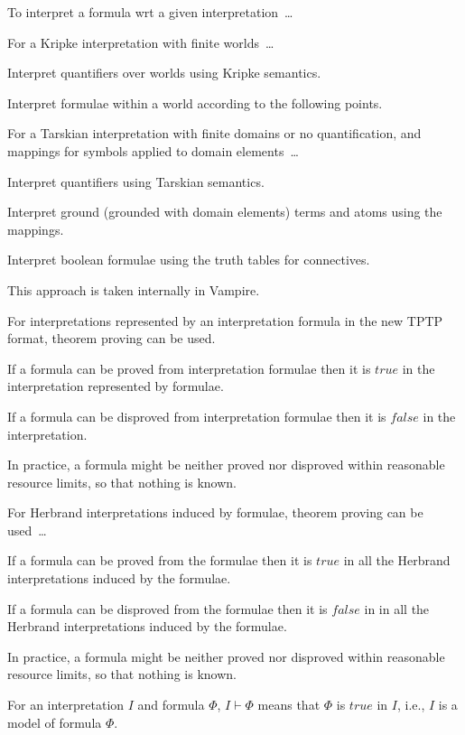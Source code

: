\documentclass{easychair}
\newenvironment{packed_itemize}{
\vspace*{-0.2em}
\begin{itemize}
\setlength{\partopsep}{0pt}
\setlength{\itemsep}{1pt}
\setlength{\parskip}{0pt}
\setlength{\parsep}{0pt}
}{\end{itemize}}
\begin{document}
To interpret a formula wrt a given interpretation~\ldots
\begin{packed_itemize}
\item For a Kripke interpretation with finite worlds~\ldots
      \begin{packed_itemize}
      \item Interpret quantifiers over worlds using Kripke semantics.
      \item Interpret formulae within a world according to the following points.
      \end{packed_itemize}
\item For a Tarskian interpretation with finite domains or no quantification, and mappings for 
      symbols applied to domain elements~\ldots
      \begin{packed_itemize}
      \item Interpret quantifiers using Tarskian semantics.
      \item Interpret ground (grounded with domain elements) terms and atoms using the mappings.
      \item Interpret boolean formulae using the truth tables for connectives.
      \end{packed_itemize}
      This approach is taken internally in Vampire.
\item For interpretations represented by an interpretation formula in the new TPTP format,
      theorem proving can be used.
      \begin{packed_itemize}
      \item If a formula can be proved from interpretation formulae then it is $true$ in the 
            interpretation represented by formulae.
      \item If a formula can be disproved from interpretation formulae then it is $false$ in the 
            interpretation.
      \item In practice, a formula might be neither proved nor disproved within reasonable 
            resource limits, so that nothing is known.
      \end{packed_itemize}
\item For Herbrand interpretations induced by formulae, theorem proving can be used~\ldots
      \begin{packed_itemize}
      \item If a formula can be proved from the formulae then it is $true$ in all the Herbrand 
            interpretations induced by the formulae.
      \item If a formula can be disproved from the formulae then it is $false$ in in all the 
            Herbrand interpretations induced by the formulae.
      \item In practice, a formula might be neither proved nor disproved within reasonable 
            resource limits, so that nothing is known.
      \end{packed_itemize}
\end{packed_itemize}
For an interpretation $I$ and formula $\Phi$, $I \vdash \Phi$ means that $\Phi$ is $true$ in $I$, 
i.e., $I$ is a model of formula $\Phi$.
\end{document}
